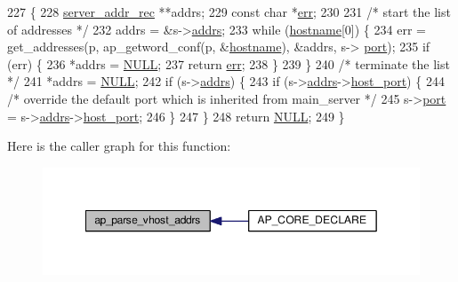 \begin{DoxyCode}
227 \{
228     \hyperlink{structserver__addr__rec}{server\_addr\_rec} **addrs;
229     \textcolor{keyword}{const} \textcolor{keywordtype}{char} *\hyperlink{group__AP__EXPR_gaccebe6c638c552d2845014cf8bdea8d8}{err};
230 
231     \textcolor{comment}{/* start the list of addresses */}
232     addrs = &s->\hyperlink{structserver__rec_a8caec41019feeb054418b6af738cdf67}{addrs};
233     \textcolor{keywordflow}{while} (\hyperlink{group__APACHE__CORE__CONFIG_gaad01339e89106fdf68f57ef118956fa9}{hostname}[0]) \{
234         err = get\_addresses(p, ap\_getword\_conf(p, &\hyperlink{group__APACHE__CORE__CONFIG_gaad01339e89106fdf68f57ef118956fa9}{hostname}), &addrs, s->
      \hyperlink{structserver__rec_ae46ad679b7fd52db7100c96003738693}{port});
235         \textcolor{keywordflow}{if} (err) \{
236             *addrs = \hyperlink{pcre_8txt_ad7f989d16aa8ca809a36bc392c07fba1}{NULL};
237             \textcolor{keywordflow}{return} \hyperlink{group__AP__EXPR_gaccebe6c638c552d2845014cf8bdea8d8}{err};
238         \}
239     \}
240     \textcolor{comment}{/* terminate the list */}
241     *addrs = \hyperlink{pcre_8txt_ad7f989d16aa8ca809a36bc392c07fba1}{NULL};
242     \textcolor{keywordflow}{if} (s->\hyperlink{structserver__rec_a8caec41019feeb054418b6af738cdf67}{addrs}) \{
243         \textcolor{keywordflow}{if} (s->\hyperlink{structserver__rec_a8caec41019feeb054418b6af738cdf67}{addrs}->\hyperlink{structserver__addr__rec_a498bb8ff02743204f9c00865a089de9a}{host\_port}) \{
244             \textcolor{comment}{/* override the default port which is inherited from main\_server */}
245             s->\hyperlink{structserver__rec_ae46ad679b7fd52db7100c96003738693}{port} = s->\hyperlink{structserver__rec_a8caec41019feeb054418b6af738cdf67}{addrs}->\hyperlink{structserver__addr__rec_a498bb8ff02743204f9c00865a089de9a}{host\_port};
246         \}
247     \}
248     \textcolor{keywordflow}{return} \hyperlink{pcre_8txt_ad7f989d16aa8ca809a36bc392c07fba1}{NULL};
249 \}
\end{DoxyCode}


Here is the caller graph for this function\+:
\nopagebreak
\begin{figure}[H]
\begin{center}
\leavevmode
\includegraphics[width=349pt]{group__APACHE__CORE__VHOST_ga6fcf77850179edd28aaac9b0adaefa6a_icgraph}
\end{center}
\end{figure}




